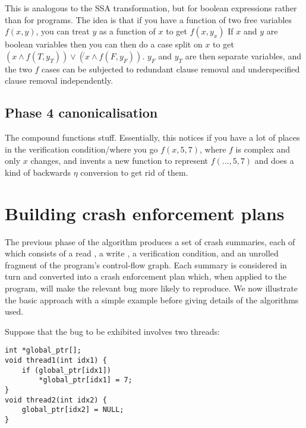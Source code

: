 This is analogous to the SSA transformation, but for boolean expressions rather than for programs.
The idea is that if you have a function of two free variables $f(x, y)$, you can treat $y$ as a function of $x$ to get $f(x, y_x)$
If $x$ and $y$ are boolean variables then you can then do a case split on $x$ to get $(x \wedge f(T, y_T)) \vee (\not{}x \wedge f(F, y_F))$.
$y_F$ and $y_T$ are then separate variables, and the two $f$ cases can be subjected to redundant clause removal and underspecified clause removal independently.



\subsection{Phase 4 canonicalisation}
The compound functions stuff.
Essentially, this notices if you have a lot of places in the verification condition/\StateMachine where you go $f(x, 5, 7)$, where $f$ is complex and only $x$ changes, and invents a new function to represent $f(..., 5, 7)$ and does a kind of backwards $\eta$ conversion to get rid of them.

\section{Building crash enforcement plans}

The previous phase of the algorithm produces a set of crash summaries, each of which consists of a read \StateMachine, a write \StateMachine, a verification condition, and an unrolled fragment of the program's control-flow graph.
Each summary is considered in turn and converted into a crash enforcement plan which, when applied to the program, will make the relevant bug more likely to reproduce.
We now illustrate the basic approach with a simple example before giving details of the algorithms used.

Suppose that the bug to be exhibited involves two threads:

\begin{verbatim}
int *global_ptr[];
void thread1(int idx1) {
    if (global_ptr[idx1])
        *global_ptr[idx1] = 7;
} 
void thread2(int idx2) {
    global_ptr[idx2] = NULL;
}
\end{verbatim}

